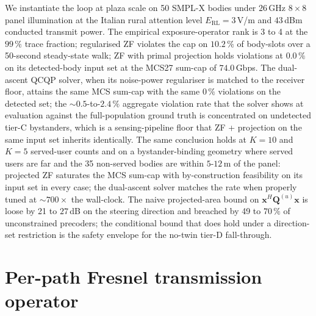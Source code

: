 \documentclass[journal,twocolumn,10pt]{IEEEtran}
\theoremstyle{plain}
\theoremstyle{remark}
\newcommand{\xx}{\mathbf{x}}
\newcommand{\Qmat}{\mathbf{Q}}
\begin{document}
We instantiate the loop at plaza scale on 50 SMPL-X bodies under
$26\,$GHz $8 \times 8$ panel illumination at the Italian rural
attention level $E_{\mathrm{RL}} = 3\,$V/m and $43\,$dBm conducted
transmit power. The empirical exposure-operator rank is 3 to 4 at
the $99\,\%$ trace fraction; regularised ZF violates the cap on
$10.2\,\%$ of body-slots over a 50-second steady-state walk; ZF
with primal projection holds violations at $0.0\,\%$ on its
detected-body input set at the MCS27 sum-cap of $74.0\,$Gbps. The
dual-ascent QCQP solver, when its noise-power regulariser is
matched to the receiver floor, attains the same MCS sum-cap with
the same $0\,\%$ violations on the detected set; the
$\sim 0.5$-to-$2.4\,\%$ aggregate violation rate that the
solver shows at evaluation against the full-population ground
truth is concentrated on undetected tier-C bystanders, which is a
sensing-pipeline floor that ZF + projection on the same input set
inherits identically. The same conclusion holds at $K = 10$ and
$K = 5$ served-user counts and on a bystander-binding geometry
where served users are far and the 35 non-served bodies are within
$5$-$12\,$m of the panel: projected ZF saturates the MCS sum-cap
with by-construction feasibility on its input set in every case;
the dual-ascent solver matches the rate when properly tuned at
$\sim 700\times$ the wall-clock. The naive projected-area bound on
$\xx^H \Qmat^{(u)} \xx$ is loose by 21 to $27\,$dB on the steering
direction and breached by 49 to $70\,\%$ of unconstrained precoders;
the conditional bound that does hold under a direction-set
restriction is the safety envelope for the no-twin tier-D
fall-through.


\appendices

\section{Per-path Fresnel transmission operator}\label{app:fresnel}
\end{document}
